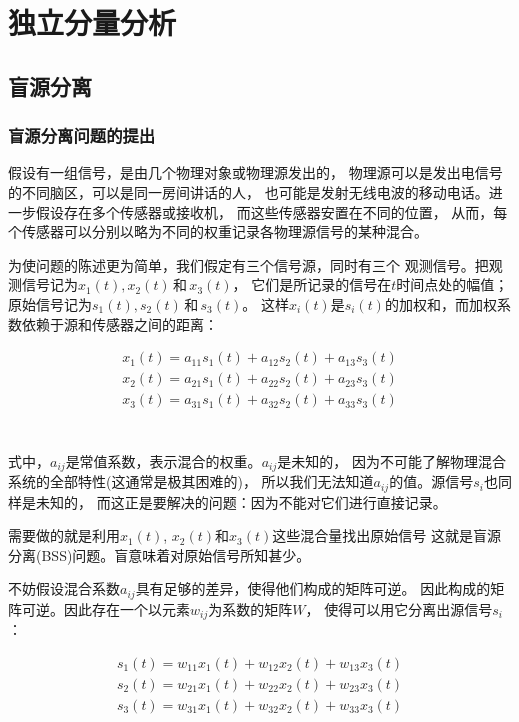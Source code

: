 ﻿%

\chapter{独立分量分析}
\label{chap02}
\section{盲源分离}

\subsection{盲源分离问题的提出}
假设有一组信号，是由几个物理对象或物理源发出的，
物理源可以是发出电信号的不同脑区，可以是同一房间讲话的人，
也可能是发射无线电波的移动电话。进一步假设存在多个传感器或接收机，
而这些传感器安置在不同的位置，
从而，每个传感器可以分别以略为不同的权重记录各物理源信号的某种混合。

为使问题的陈述更为简单，我们假定有三个信号源，同时有三个
观测信号。把观测信号记为$x_1(t), x_2(t) \,\mbox{和}\, x_3(t)$，
它们是所记录的信号在$t$时间点处的幅值；
原始信号记为$s_1(t), s_2(t)\,和\,s_3(t)$。
这样$x_i(t)$是$s_i(t)$的加权和，而加权系数依赖于源和传感器之间的距离：

\parbox{10cm}{
\begin{eqnarray*}
x_1(t)=a_{11}s_1(t)+a_{12}s_2(t)+a_{13}s_3(t) \\
x_2(t)=a_{21}s_1(t)+a_{22}s_2(t)+a_{23}s_3(t) \\
x_3(t)=a_{31}s_1(t)+a_{32}s_2(t)+a_{33}s_3(t) \\
\end{eqnarray*}
}\hfill
\parbox{3cm}{\begin{eqnarray} \label{bss_compose}\end{eqnarray}}

式中，$a_{ij}$是常值系数，表示混合的权重。$a_{ij}$是未知的，
因为不可能了解物理混合系统的全部特性(这通常是极其困难的)，
所以我们无法知道$a_{ij}$的值。源信号$s_i$也同样是未知的，
而这正是要解决的问题：因为不能对它们进行直接记录。
    
需要做的就是利用$x_1(t)$, $x_2(t)$和$x_3(t)$这些混合量找出原始信号
这就是盲源分离(BSS)问题。盲意味着对原始信号所知甚少。

不妨假设混合系数$a_{ij}$具有足够的差异，使得他们构成的矩阵可逆。
因此构成的矩阵可逆。因此存在一个以元素$w_{ij}$为系数的矩阵$W$，
使得可以用它分离出源信号$s_i$：
 
\parbox{10cm}{
\begin{eqnarray*}
s_1(t)=w_{11}x_1(t)+w_{12}x_2(t)+w_{13}x_3(t) \\
s_2(t)=w_{21}x_1(t)+w_{22}x_2(t)+w_{23}x_3(t) \\
s_3(t)=w_{31}x_1(t)+w_{32}x_2(t)+w_{33}x_3(t) \\
\end{eqnarray*}
}\hfill
\parbox{3cm}{\begin{eqnarray}\label{bss_slover} \end{eqnarray}}

